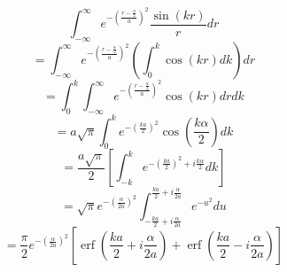 \documentclass[double,12pt]{beavtex}
\begin{document}
\begin{equation}{\int_{-\infty}^{\infty}{e^{-\left(\frac{r-\frac{\alpha}{2}}{a}\right)^2}\frac{\sin(kr)}{r}d{r}}}\end{equation} 
\begin{displaymath}{=\int_{-\infty}^{\infty}{e^{-\left(\frac{r-\frac{\alpha}{2}}{a}\right)^2}\left(\int_{0}^{k}{\cos(kr)d{k}}\right)d{r}}}\end{displaymath} 
\begin{displaymath}{=\int_{0}^{k}\int_{-\infty}^{\infty}{e^{-\left(\frac{r-\frac{\alpha}{2}}{a}\right)^2}{\cos(kr)d{r}}d{k}}}\end{displaymath} 
\begin{displaymath}{=a\sqrt{\pi}\int_{0}^{k}e^{-\left(\frac{ka}{2}\right)^2}\cos\left(\frac{k\alpha}{2}\right)d{k} }\end{displaymath} 
\begin{displaymath}{=\frac{a\sqrt{\pi}}{2}\left[\int_{-k}^{k}e^{-\left(\frac{ka}{2}\right)^2 + i\frac{k\alpha}{2}}d{k}\right]}\end{displaymath} 
\begin{displaymath}{=\sqrt{\pi}e^{-\left(\frac{\alpha}{2a}\right)^2}\int_{-\frac{ka}{2}+i\frac{\alpha}{2a}}^{\frac{ka}{2}+i\frac{\alpha}{2a}}e^{-u^2}d{u}}\end{displaymath} 
\begin{equation}{=\frac{\pi}{2}e^{-\left(\frac{\alpha}{2a}\right)^2}\left[\operatorname{erf}\left(\frac{ka}{2}+i\frac{\alpha}{2a}\right)+\operatorname{erf}\left(\frac{ka}{2}-i\frac{\alpha}{2a}\right)\right]}\end{equation} 
\end{document}
